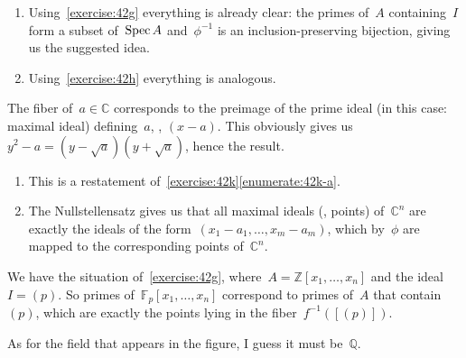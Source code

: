 \begin{exercise}
  \label{exercise:42k}
  \begin{enumerate}
    \item\label{enumerate:42k-a} Using~\autoref{exercise:42g} everything is already clear: the primes of~$A$ containing~$I$ form a subset of~$\operatorname{Spec} A$ and~$\phi^{-1}$ is an inclusion-preserving bijection, giving us the suggested idea.

    \item Using~\autoref{exercise:42h} everything is analogous.
  \end{enumerate}
\end{exercise}

\begin{exercise}
  The fiber of~$a\in\mathbb{C}$ corresponds to the preimage of the prime ideal (in this case: maximal ideal) defining~$a$, \ie, $(x-a)$. This obviously gives us~$y^2-a=(y-\sqrt{a})(y+\sqrt{a})$, hence the result.
\end{exercise}

\begin{exercise}
  \begin{enumerate}
    \item This is a restatement of~\autoref{exercise:42k}\ref{enumerate:42k-a}.

    \item The Nullstellensatz gives us that all maximal ideals (\ie, points) of~$\mathbb{C}^n$ are exactly the ideals of the form~$(x_1-a_1,\ldots,x_m-a_m)$, which by~$\phi$ are mapped to the corresponding points of~$\mathbb{C}^n$.
  \end{enumerate}
\end{exercise}

\begin{exercise}
  \label{exercise:42n}
  We have the situation of~\autoref{exercise:42g}, where~$A=\mathbb{Z}[x_1,\ldots,x_n]$ and the ideal~$I=(p)$. So primes of~$\mathbb{F}_p[x_1,\ldots,x_n]$ correspond to primes of~$A$ that contain~$(p)$, which are exactly the points lying in the fiber~$f^{-1}([(p)])$.

  As for the field that appears in the figure, I guess it must be~$\mathbb{Q}$.
\end{exercise}


